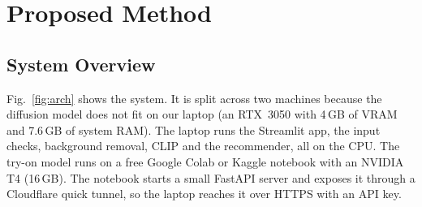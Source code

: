 \documentclass{article}
\begin{document}
\section{Proposed Method}
\label{sec:method}

\subsection{System Overview}
\label{sec:overview}

Fig.~\ref{fig:arch} shows the system. It is split across two machines because the diffusion model
does not fit on our laptop (an RTX~3050 with 4\,GB of VRAM and 7.6\,GB of system RAM). The laptop runs
the Streamlit app, the input checks, background removal, CLIP and the recommender, all on the CPU. The
try-on model runs on a free Google Colab or Kaggle notebook with an NVIDIA T4 (16\,GB). The notebook
starts a small FastAPI server and exposes it through a Cloudflare quick tunnel, so the laptop reaches it
over HTTPS with an API key.
\end{document}
